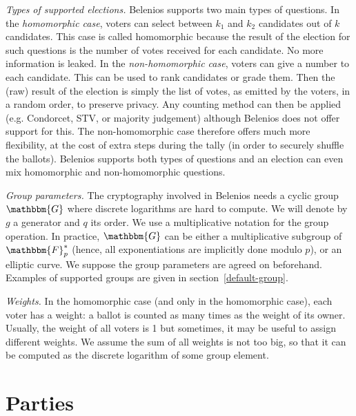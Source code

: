 \documentclass[a4paper]{article}
\newcommand{\F}{\mathbbm{F}}
\newcommand{\G}{\mathbbm{G}}
\begin{document}
{\it Types of supported elections.}
Belenios supports two main types of questions.
In the \emph{homomorphic case}, voters can select between $k_1$ and
$k_2$ candidates out of $k$ candidates. This case is called
homomorphic because the result of the election for such questions is
the number of votes received for each candidate. No more information
is leaked.
In the \emph{non-homomorphic case}, voters can give a number to each
candidate. This can be used to rank candidates or grade them. Then the
(raw) result of the election is simply the list of votes, as emitted
by the voters, in
a random order, to preserve privacy.
Any counting method can then be  applied
(e.g. Condorcet, STV, or majority judgement) although Belenios does
not offer support for this.
The non-homomorphic case  therefore offers much more flexibility, at
the cost of extra steps during the tally (in order to securely shuffle
the ballots).
Belenios supports both types of questions and an election can even
mix homomorphic and non-homomorphic questions.
\medskip

{\it Group parameters.}
The cryptography involved in Belenios needs a cyclic group $\G$ where
discrete logarithms are hard to compute. We will denote by $g$ a
generator and $q$ its order. We use a multiplicative notation for the
group operation. In practice, $\G$ can be either a multiplicative
subgroup of $\F^*_p$ (hence, all exponentiations are implicitly done
modulo $p$), or an elliptic curve. We suppose the group parameters are agreed on
beforehand. Examples of supported groups are given in
section~\ref{default-group}.

\medskip

{\it Weights.}  In the homomorphic case (and only in the homomorphic
case), each voter has a weight: a
ballot is counted as many times as the weight of its owner. Usually,
the weight of all voters is 1 but sometimes, it may be useful to
assign different weights. We assume the sum of all weights is not too
big, so that it can be computed as the discrete logarithm of some
group element.

\section{Parties}

\newcommand{\pk}{\texttt{public\_key}}
\newcommand{\sk}{\texttt{private\_key}}
\newcommand{\proof}{\texttt{proof}}
\newcommand{\iproof}{\texttt{iproof}}
\newcommand{\ciphertext}{\texttt{ciphertext}}
\end{document}
